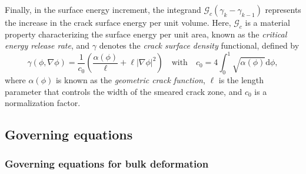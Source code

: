 \documentclass{article}
\begin{document}
Finally, in the surface energy increment, the integrand $\mathcal G_c(\gamma_k - \gamma_{k-1})$ represents the increase in the crack surface energy per unit volume. Here, $\mathcal G_c$ is a material property characterizing the surface energy per unit area, known as the \textit{critical energy release rate}, and $\gamma$ denotes the \textit{crack surface density} functional, defined by
\begin{equation}\label{eq:gamma}
  \gamma(\phi,\nabla\phi) = \frac{1}{c_0}\left(\frac{\alpha(\phi)}{\ell} + \ell|\nabla\phi|^2\right)\quad\text{with}\quad
  c_0 = 4\int_0^1\sqrt{\alpha(\phi)}\mathrm d\phi,
\end{equation}
where $\alpha(\phi)$ is known as the \textit{geometric crack function}, $\ell$ is the length parameter that controls the width of the smeared crack zone, and $c_0$ is a normalization factor.


\subsection{Governing equations}

\subsubsection{Governing equations for bulk deformation}
\end{document}
